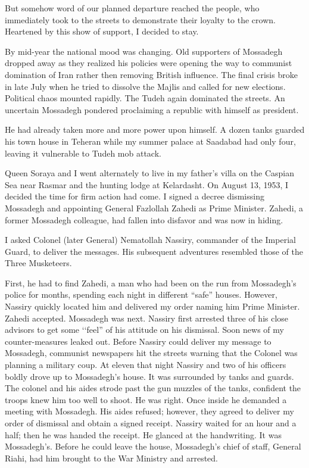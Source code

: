 But somehow word of our planned departure reached the people, who immediately took to the streets to demonstrate their loyalty to the crown. Heartened by this show of support, I decided to stay. 

By mid-year the national mood was changing. Old supporters of Mossadegh dropped away as they realized his policies were opening the way to communist domination of Iran rather then removing British influence. The final crisis broke in late July when he tried to dissolve the Majlis and called for new elections. Political chaos mounted rapidly. The Tudeh again dominated the streets. An uncertain Mossadegh pondered proclaiming a republic with himself as president. 

He had already taken more and more power upon himself. A dozen tanks guarded his town house in Teheran while my summer palace at Saadabad had only four, leaving it vulnerable to Tudeh mob attack. 


Queen Soraya and I went alternately to live in my father’s villa on the Caspian Sea near Rasmar and the hunting lodge at Kelardasht. On August 13, 1953, I decided the time for firm action had come. I signed a decree dismissing Mossadegh and appointing General Fazlollah Zahedi as Prime Minister. Zahedi, a former Mossadegh colleague, had fallen into disfavor and was now in hiding. 

I asked Colonel (later General) Nematollah Nassiry, commander of the Imperial Guard, to deliver the messages. His subsequent adventures resembled those of the Three Musketeers. 

First, he had to find Zahedi, a man who had been on the run from Mossadegh’s police for months, spending each night in different “safe” houses. However, Nassiry quickly located him and delivered my order naming him Prime Minister. Zahedi accepted. Mossadegh was next. Nassiry first arrested three of his close advisors to get some ‘‘feel” of his attitude on his dismissal. Soon news of my counter-measures leaked out. Before Nassiry could deliver my message to Mossadegh, communist newspapers hit the streets warning that the Colonel was planning a military coup. At eleven that night Nassiry and two of his officers boldly drove up to Mossadegh’s house. It was surrounded by tanks and guards. The colonel and his aides strode past the gun muzzles of the tanks, confident the troops knew him too well to shoot. He was right. Once inside he demanded a meeting with Mossadegh. His aides refused; however, they agreed to deliver my order of dismissal and obtain a signed receipt. Nassiry waited for an hour and a half; then he was handed the receipt. He glanced at the handwriting. It was Mossadegh’s. Before he could leave the house, Mossadegh’s chief of staff, General Riahi, had him brought to the War Ministry and arrested. 

